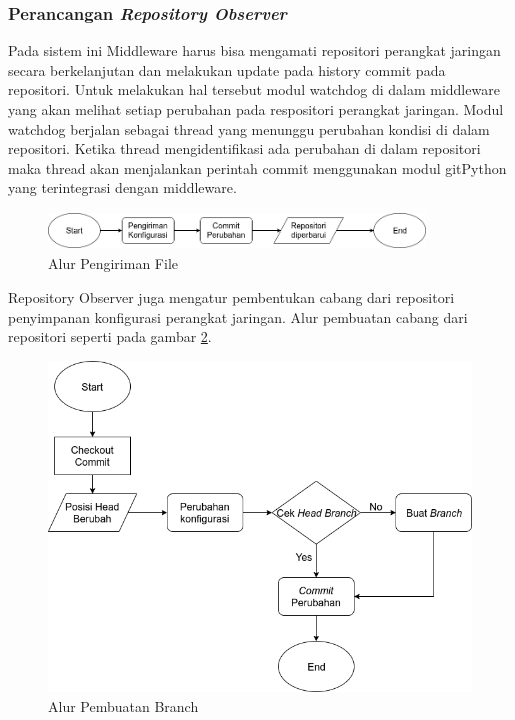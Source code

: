         \subsubsection{Perancangan \textit{Repository Observer}}
            Pada sistem ini Middleware harus bisa mengamati repositori perangkat jaringan secara berkelanjutan dan melakukan update pada history commit pada repositori. Untuk melakukan hal tersebut modul watchdog di dalam middleware yang akan melihat setiap perubahan pada respositori perangkat jaringan. Modul watchdog berjalan sebagai thread yang menunggu perubahan kondisi di dalam repositori. Ketika thread mengidentifikasi ada perubahan di dalam repositori maka thread akan menjalankan perintah commit menggunakan modul gitPython yang terintegrasi dengan middleware.
            \begin{figure}[H]
            	\centering
            	\includegraphics[width=10cm,height=1cm]{Images/C-3/AlurPengirimanFile.png}
            	\caption{Alur Pengiriman File}
            	\label{desain:pengiriman file}
            \end{figure}
	        \indent Repository Observer juga mengatur pembentukan cabang dari repositori penyimpanan konfigurasi perangkat jaringan. Alur pembuatan cabang dari repositori seperti pada gambar \ref{CreateBranch}.
	        \begin{figure}[H]
	        	\centering
	        	\includegraphics[width=\textwidth]{Images/C-3/CreateBranch.png}
	        	\caption{Alur Pembuatan Branch}
	        	\label{CreateBranch}
	        \end{figure}
        
